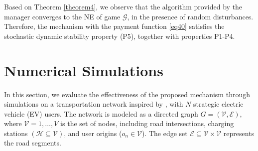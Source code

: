 \documentclass[twocolumn]{autart}
\begin{document}
Based on Theorem \ref{theorem4}, we observe that the algorithm provided by the manager converges to the NE of game $\mathcal{G}$, in the presence of random disturbances. Therefore, the mechanism with the payment function \eqref{eq40} satisfies the stochastic dynamic stability property (P5), together with properties P1-P4.
\section{Numerical Simulations}
In this section, we evaluate the effectiveness of the proposed mechanism through simulations on a transportation network inspired by \cite{bakhshayesh2021decentralized}, with $N$ strategic electric vehicle (EV) users. The network is modeled as a directed graph $G=(\mathcal{V},\mathcal{E})$, where $\mathcal{V}={1,\ldots,V}$ is the set of nodes, including road intersections, charging stations $(\mathcal{H}\subseteq\mathcal{V})$, and user origins ($o_n\in\mathcal{V}$). The edge set $\mathcal{E}\subseteq\mathcal{V}\times\mathcal{V}$ represents the road segments.
\end{document}
